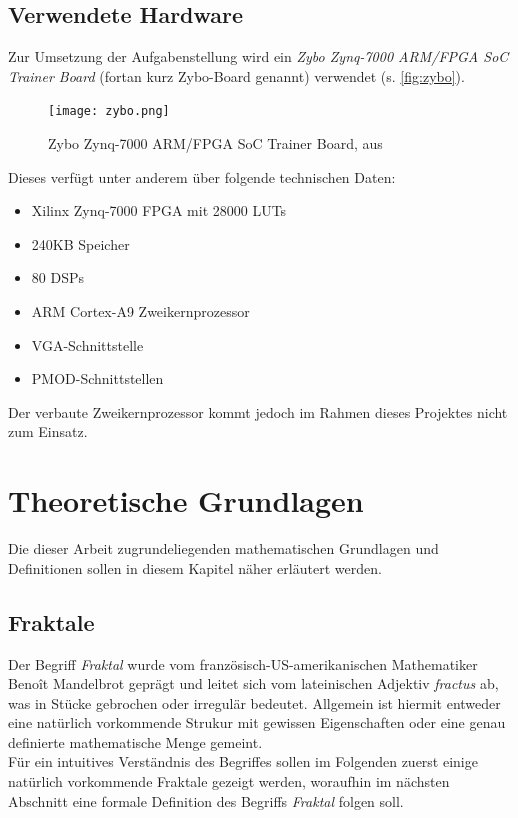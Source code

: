 \documentclass[a4paper,12pt,onesided]{report}
\begin{document}
\section{Verwendete Hardware}
\label{sec:zybo-specs}
Zur Umsetzung der Aufgabenstellung wird ein \textit{Zybo Zynq-7000 ARM/FPGA SoC Trainer Board} (fortan kurz Zybo-Board genannt) verwendet (s. \autoref{fig:zybo}).
\begin{figure}[H]
	\centering
	\texttt{[image: zybo.png]}
	\caption{Zybo Zynq-7000 ARM/FPGA SoC Trainer Board, aus \cite{zybo}}
	\label{fig:zybo}
\end{figure}
Dieses verfügt unter anderem über folgende technischen Daten:
\begin{itemize}
	\item Xilinx Zynq-7000 FPGA mit 28000 LUTs
	\item 240KB Speicher
	\item 80 DSPs
	\item ARM Cortex-A9 Zweikernprozessor
	\item VGA-Schnittstelle
	\item PMOD-Schnittstellen
\end{itemize}
Der verbaute Zweikernprozessor kommt jedoch im Rahmen dieses Projektes nicht zum Einsatz.

\chapter{Theoretische Grundlagen}
Die dieser Arbeit zugrundeliegenden mathematischen Grundlagen und Definitionen sollen in diesem Kapitel näher erläutert werden.

\section{Fraktale}
Der Begriff \textit{Fraktal} wurde vom französisch-US-amerikanischen Mathematiker Benoît Mandelbrot geprägt und leitet sich vom lateinischen Adjektiv \textit{fractus} ab, was \glqq in Stücke gebrochen\grqq{} oder \glqq irregulär\grqq{} bedeutet.
Allgemein ist hiermit entweder eine natürlich vorkommende Strukur mit gewissen Eigenschaften oder eine genau definierte mathematische Menge gemeint. \cite[S. 16]{mandelbrot2013fraktale}\\
Für ein intuitives Verständnis des Begriffes sollen im Folgenden zuerst einige natürlich vorkommende Fraktale gezeigt werden, woraufhin im nächsten Abschnitt eine formale Definition des Begriffs \textit{Fraktal} folgen soll.
\end{document}

